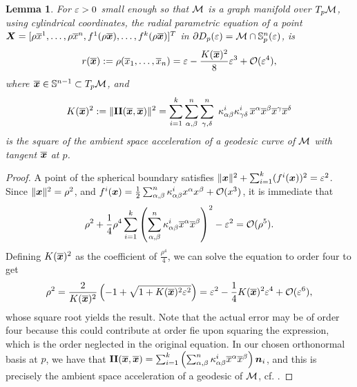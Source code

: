 \documentclass[letterpaper, reqno, 11pt]{amsart}
\newtheorem{lemma}[theorem]{Lemma}
\theoremstyle{definition}
\theoremstyle{remark}
\numberwithin{equation}{section}
\begin{document}
\begin{lemma}\label{lem:boundary}
	For $\varepsilon>0$ small enough so that ${\mathcal M}$ is a graph manifold over $T_p{\mathcal M}$, using cylindrical coordinates, the radial parametric equation of a point $\boldsymbol{X}=[\rho\overline{x}^1,\dots,\rho\overline{x}^n, f^1(\rho\boldsymbol{\overline{x}}),\dots,f^k(\rho\boldsymbol{\overline{x}})]^T$ in $\partial D_p(\varepsilon)={\mathcal M}\cap {\mathbb S}^{n}_p(\varepsilon)$, is
\begin{equation}
	r(\boldsymbol{\overline{x}}):=\rho(\overline{x}_1,\dots,\overline{x}_n) = \varepsilon -\frac{K(\boldsymbol{\overline{x}})^2}{8}\varepsilon^3 +{\mathcal O}(\varepsilon^4) ,
\end{equation}
	where $\boldsymbol{\overline{x}}\in{\mathbb S}^{n-1}\subset T_p{\mathcal M}$, and
\begin{equation}\label{eq:geoAcc}
	K(\boldsymbol{\overline{x}})^2 :=\|\boldsymbol{\mathrm{II}}(\boldsymbol{\overline{x}},\boldsymbol{\overline{x}}) \|^2=\sum_{i=1}^k\sum_{\alpha,\beta}^n\sum_{\gamma,\delta}^n\;\kappa^i_{\alpha\beta}\kappa^i_{\gamma\delta}\,\overline{x}^\alpha\overline{x}^\beta\overline{x}^\gamma\overline{x}^\delta
\end{equation}
is the square of the ambient space acceleration of a geodesic curve of ${\mathcal M}$ with tangent $\boldsymbol{\overline{x}}$ at $p$.
\end{lemma}
\begin{proof}
A point of the spherical boundary satisfies $\|\boldsymbol{x}\|^2+\sum_{i=1}^k (f^i(\boldsymbol{x}))^2=\varepsilon^2$. Since $\|\boldsymbol{x}\|^2=\rho^2$, and $f^i(\boldsymbol{x})=\frac{1}{2}\sum^n_{\alpha,\beta}\kappa^i_{\alpha\beta}x^\alpha x^\beta+{\mathcal O}(x^3)$, it is immediate that
 $$
 \rho^2+\frac{1}{4}\rho^4\sum_{i=1}^k\left(\sum^n_{\alpha,\beta}\kappa^i_{\alpha\beta}\overline{x}^\alpha\overline{x}^\beta\right)^2 -\varepsilon^2 = {\mathcal O}(\rho^5).
 $$
Defining $K(\boldsymbol{\overline{x}})^2$ as the coefficient of $\frac{\rho^4}{4}$, we can solve the equation to order four to get
	$$
	\rho^2 = \frac{2}{K(\boldsymbol{\overline{x}})^2}\left(-1 +\sqrt{1+K(\boldsymbol{\overline{x}})^2\varepsilon^2}\right) = \varepsilon^2 -\frac{1}{4}K(\boldsymbol{\overline{x}})^2\varepsilon^4+{\mathcal O}(\varepsilon^6),
	$$
whose square root yields the result. Note that the actual error may be of order four because this could contribute at order fie upon squaring the expression, which is the order neglected in the original equation.
In our chosen orthonormal basis at $p$, we have that $\boldsymbol{\mathrm{II}}(\boldsymbol{\overline{x}},\boldsymbol{\overline{x}})= \sum_{i=1}^k\left(\sum^n_{\alpha,\beta}\kappa^i_{\alpha\beta}\overline{x}^\alpha \overline{x}^\beta\right)\boldsymbol{n}_i$, and this is precisely the ambient space acceleration of a geodesic of ${\mathcal M}$, cf. \cite[ch. 4, Cor. 10]{oneil1983}.
\end{proof}
\end{document}
